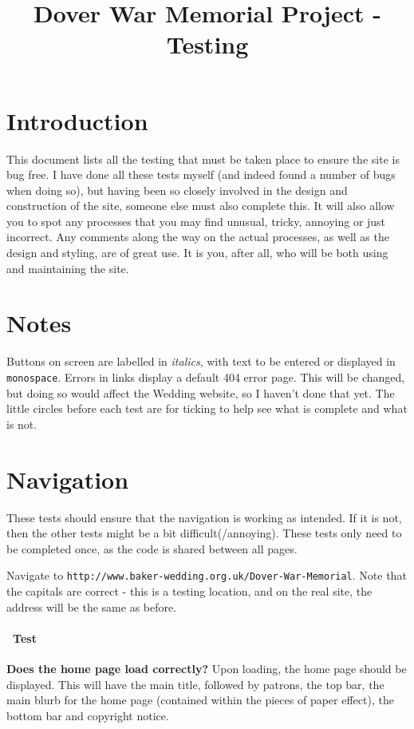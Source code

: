 \documentclass[12pt]{article}
\title{\textbf{Dover War Memorial Project - Testing}}
\date{}
\author{}
\newcounter{Test}
\newcommand{\test}[1]{%
\stepcounter{Test}%
\paragraph{\Circle\ Test \theTest} \textbf{#1} }
\begin{document}
\maketitle

\tableofcontents
\newpage

\section{Introduction}

This document lists all the testing that must be taken place to ensure the site is bug free. I have done all these tests myself (and indeed found a number of bugs when doing so), but having been so closely involved in the design and construction of the site, someone else must also complete this. It will also allow you to spot any processes that you may find unusual, tricky, annoying or just incorrect. Any comments along the way on the actual processes, as well as the design and styling, are of great use. It is you, after all, who will be both using and maintaining the site. \smiley

\section{Notes}
Buttons on screen are labelled in \textit{italics}, with text to be entered or displayed in \texttt{monospace}. Errors in links display a default 404 error page. This will be changed, but doing so would affect the Wedding website, so I haven't done that yet. The little circles before each test are for ticking to help see what is complete and what is not.

\section{Navigation}

These tests should ensure that the navigation is working as intended. If it is not, then the other tests might be a bit difficult(/annoying). These tests only need to be completed once, as the code is shared between all pages.

Navigate to \texttt{http://www.baker-wedding.org.uk/Dover-War-Memorial}. Note that the capitals are correct - this is a testing location, and on the real site, the address will be the same as before.
\test {Does the home page load correctly?}
Upon loading, the home page should be displayed. This will have the main title, followed by patrons, the top bar, the main blurb for the home page (contained within the pieces of paper effect), the bottom bar and copyright notice.
\end{document}
